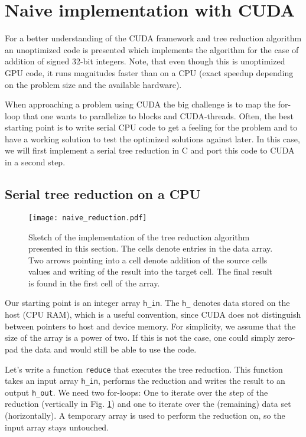 \section{Naive implementation with CUDA}
For a better understanding of the CUDA framework and tree reduction algorithm an unoptimized code is presented which implements the algorithm for the case of addition of signed 32-bit integers. 
Note, that even though this is unoptimized GPU code, it runs magnitudes faster than on a CPU (exact speedup depending on the problem size and the available hardware).

When approaching a problem using CUDA the big challenge is to map the for-loop that one wants to parallelize to blocks and CUDA-threads. 
Often, the best starting point is to write serial CPU code to get a feeling for the problem and to have a working solution to test the optimized solutions against later.
In this case, we will first implement a serial tree reduction in C and port this code to CUDA in a second step.

\subsection{Serial tree reduction on a CPU}
\begin{figure}
    \centering
    \texttt{[image: naive\_reduction.pdf]}
    \caption{
        Sketch of the implementation of the tree reduction algorithm presented in this section.
        The cells denote entries in the data array.
        Two arrows pointing into a cell denote addition of the source cells values and writing of the result into the target cell.
        The final result is found in the first cell of the array.
    } \label{fig_naive_reduction}
\end{figure}
Our starting point is an integer array \texttt{h\_in}.
The \texttt{h\_} denotes data stored on the host (CPU RAM), which is a useful convention, since CUDA does not distinguish between pointers to host and device memory.
For simplicity, we assume that the size of the array is a power of two.
If this is not the case, one could simply zero-pad the data and would still be able to use the code.

Let's write a function \texttt{reduce} that executes the tree reduction.
This function takes an input array \texttt{h\_in}, performs the reduction and writes the result to an output \texttt{h\_out}. 
We need two for-loops:
One to iterate over the step of the reduction (vertically in Fig. \ref{fig_naive_reduction}) and one to iterate over the (remaining) data set (horizontally). 
A temporary array is used to perform the reduction on, so the input array stays untouched.

